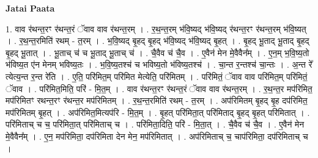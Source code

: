 \documentclass[17pt]{extarticle}
\begin{document}
\textbf{Jatai Paata} \newline

1. वाव र॑थन्त॒रꣳ र॑थन्त॒रं ॅवाव वाव र॑थन्त॒रम् । . र॒थ॒न्त॒रम् भ॑वि॒ष्यद् भ॑वि॒ष्यद् र॑थन्त॒रꣳ र॑थन्त॒रम् भ॑वि॒ष्यत् । . र॒थ॒न्त॒रमिति॑ रथम् - त॒रम् । . भ॒वि॒ष्यद् बृ॒हद् बृ॒हद् भ॑वि॒ष्यद् भ॑वि॒ष्यद् बृ॒हत् । . बृ॒हद् भू॒ताद् भू॒ताद् बृ॒हद् बृ॒हद् भू॒तात् । . भू॒ताच् च॑ च भू॒ताद् भू॒ताच् च॑ । . चै॒वैव च॑ चै॒व । . ए॒वैन॑ मेन मे॒वैवैन᳚म् । . ए॒न॒म् भ॒वि॒ष्य॒तो भ॑विष्य॒त ए॑न मेनम् भविष्य॒तः । . भ॒वि॒ष्य॒तश्च॑ च भविष्य॒तो भ॑विष्य॒तश्च॑ । . चा॒न्त र॒न्तश्च॑ चा॒न्तः । . अ॒न्त रे᳚ त्येत्य॒न्त र॒न्त रे॑ति । . ए॒ति॒ परि॑मित॒म् परि॑मित मेत्येति॒ परि॑मितम् । . परि॑मितं॒ ॅवाव वाव परि॑मित॒म् परि॑मितं॒ ॅवाव । . परि॑मित॒मिति॒ परि॑ - मि॒त॒म् । . वाव र॑थन्त॒रꣳ र॑थन्त॒रं ॅवाव वाव र॑थन्त॒रम् । . र॒थ॒न्त॒र मप॑रिमित॒ मप॑रिमितꣳ रथन्त॒रꣳ र॑थन्त॒र मप॑रिमितम् । . र॒थ॒न्त॒रमिति॑ रथम् - त॒रम् । . अप॑रिमितम् बृ॒हद् बृ॒ह दप॑रिमित॒ मप॑रिमितम् बृ॒हत् । . अप॑रिमित॒मित्यप॑रि - मि॒त॒म् । . बृ॒हत् परि॑मिता॒त् परि॑मिताद् बृ॒हद् बृ॒हत् परि॑मितात् । . परि॑मिताच् च च॒ परि॑मिता॒त् परि॑मिताच् च । . परि॑मिता॒दिति॒ परि॑ - मि॒ता॒त् । . चै॒वैव च॑ चै॒व । . ए॒वैन॑ मेन मे॒वैवैन᳚म् । . ए॒न॒ मप॑रिमिता॒ दप॑रिमिता देन मेन॒ मप॑रिमितात् । . अप॑रिमिताच् च॒ चाप॑रिमिता॒ दप॑रिमिताच् च । \newline
\end{document}
